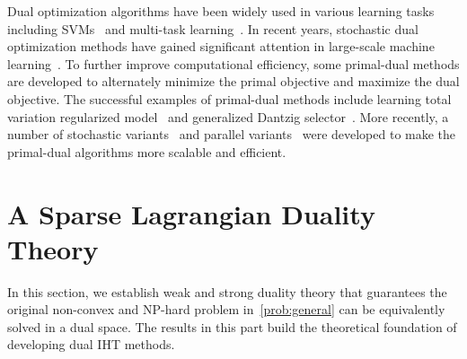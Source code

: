 \documentclass[11pt]{article}
\numberwithin{equation}{section}
\numberwithin{table}{section}
\numberwithin{figure}{section}
\begin{document}
Dual optimization algorithms have been widely used in various learning tasks including SVMs~\citep{hsieh2008dual} and multi-task learning~\citep{lapin2014scalable}. In recent years, stochastic dual optimization methods have gained significant attention in large-scale machine learning~\citep{shalev2013accelerated,shalev2013stochastic}. To further improve computational efficiency, some primal-dual methods are developed to alternately minimize the primal objective and maximize the dual objective. The successful examples of primal-dual methods include learning total variation regularized model~\citep{chambolle2011first} and generalized Dantzig selector~\citep{lee2015fast}. More recently, a number of stochastic variants~\citep{zhang2015stochastic,yu2015doubly} and parallel variants~\citep{zhu2015stochastic} were developed to make the primal-dual algorithms more scalable and efficient.

\section{A Sparse Lagrangian Duality Theory}
\label{sect:theory}
In this section, we establish weak and strong duality theory that guarantees the original non-convex and NP-hard problem in~\eqref{prob:general} can be equivalently solved in a dual space. The results in this part build the theoretical foundation of developing dual IHT methods.
\end{document}
